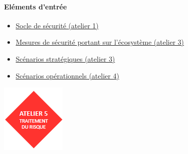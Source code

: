 \documentclass[french, 12pt]{article}%
\newcommand{\itemE}{\item[$\bullet$]}
\begin{document}
\begin{minipage}[c]{0.6\linewidth}
\paragraph{Eléments d'entrée}
\begin{itemize}
    \itemE \href{run:./ressource_eleve/Atelier1/AX_documents.ods}{Socle de sécurité (atelier 1)}
    \itemE \href{run:./ressource_eleve/Atelier3/A3_documents.ods}{Mesures de sécurité portant sur l’écosystème (atelier 3)}
    \itemE \href{run:./ressource_eleve/Atelier3/A3_documents.ods}{Scénarios stratégiques (atelier 3)}
	\itemE \href{run:./ressource_eleve/Atelier4/A4_documents.ods}{Scénarios opérationnels (atelier 4)}
\end{itemize}

\end{minipage}
\begin{minipage}[c]{0.4\linewidth}
\begin{center}
\includegraphics[scale=0.8]{./ressource/logoA5.png}
\end{center}
\end{minipage}
\end{document}
